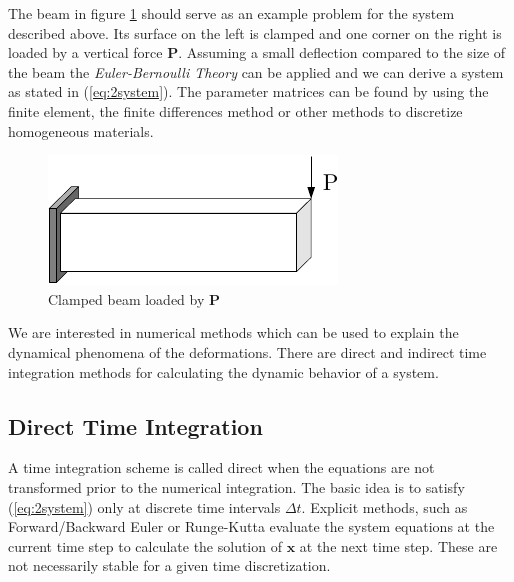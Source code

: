 \documentclass[conference]{journal}
\newcommand{\B}[1]{\mathbf{#1}}
\newcommand{\Bx}{\B{x}}
\begin{document}
	The beam in figure \ref{fig:beam} should serve as an example problem for the system described above. Its surface on the left is clamped and one corner on the right is loaded by a vertical force $\B{P}$. Assuming a small deflection compared to the size of the beam the \textit{Euler-Bernoulli Theory} can be applied and we can derive a system as stated in (\ref{eq:2system}). The parameter matrices can be found by using the finite element, the finite differences method or other methods to discretize homogeneous materials.

	\begin{figure}[h]
	\centering
	\includegraphics{./figures/beam.pdf}
	\caption{Clamped beam loaded by $\B{P}$}
	\label{fig:beam}
	\end{figure}

	We are interested in numerical methods which can be used to explain the dynamical phenomena of the deformations. There are direct and indirect time integration methods for calculating the dynamic behavior of a system.


	\subsection{Direct Time Integration}
	A time integration scheme is called direct when the equations are not transformed prior to the numerical integration. The basic idea is to satisfy (\ref{eq:2system}) only at discrete time intervals $\Delta t$. Explicit methods, such as Forward/Backward Euler or Runge-Kutta evaluate the system equations at the current time step to calculate the solution of $\Bx$ at the next time step. These are not necessarily stable for a given time discretization.
\end{document}
